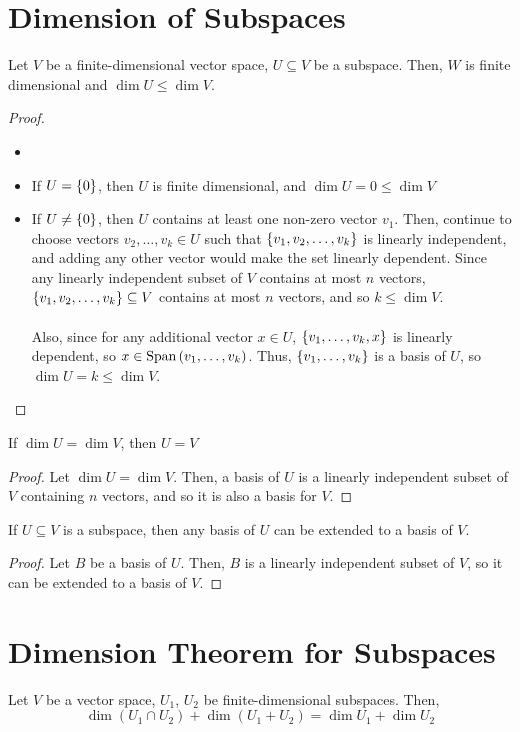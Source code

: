 \documentclass[letterpaper,12pt]{article}
\begin{document}
\section*{Dimension of Subspaces}
\begin{theorem}
Let $V$ be a finite-dimensional vector space, $U \subseteq V$ be a subspace. Then, $W$ is finite dimensional and $\dim{U} \leq \dim{V}$.
\end{theorem}
\begin{proof}
\begin{itemize}
    \item[]
    \item If $U = \left\{ 0 \right\}$, then $U$ is finite dimensional, and $\dim{U} = 0 \leq \dim{V}$
    \item If $U \neq \left\{ 0 \right\}$, then $U$ contains at least one non-zero vector $v_1$. Then, continue to choose vectors $v_2, \dots, v_k \in U$ such that $\left\{ v_1, v_2, \dots, v_k \right\}$ is linearly independent, and adding any other vector would make the set linearly dependent. Since any linearly independent subset of $V$ contains at most $n$ vectors, $\left\{ v_1, v_2, \dots, v_k \right\} \subseteq V$ contains at most $n$ vectors, and so $k \leq \dim{V}$.
    \\ \\ Also, since for any additional vector $x \in U$, $\left\{ v_1, \dots, v_k, x \right\}$ is linearly dependent, so $x \in \text{Span}\left(v_1, \dots, v_k \right)$. Thus, $\left\{ v_1, \dots, v_k \right\}$ is a basis of $U$, so $\dim{U} = k \leq \dim{V}$.
\end{itemize}
\end{proof}

\begin{corollary}
If $\dim{U} = \dim{V}$, then $U = V$
\end{corollary}
\begin{proof}
Let $\dim{U} = \dim{V}$. Then, a basis of $U$ is a linearly independent subset of $V$ containing $n$ vectors, and so it is also a basis for $V$.
\end{proof}

\begin{corollary}
If $U \subseteq V$ is a subspace, then any basis of $U$ can be extended to a basis of $V$.
\end{corollary}
\begin{proof}
Let $B$ be a basis of $U$. Then, $B$ is a linearly independent subset of $V$, so it can be extended to a basis of $V$.
\end{proof}

\section*{Dimension Theorem for Subspaces}
\begin{theorem}
Let $V$ be a vector space, $U_1$, $U_2$ be finite-dimensional subspaces. Then,
\begin{equation*}
    \boxed{\dim{(U_1 \cap U_2)} + \dim{(U_1 + U_2)} = \dim{U_1} + \dim{U_2}}
\end{equation*}
\end{theorem}
\end{document}
